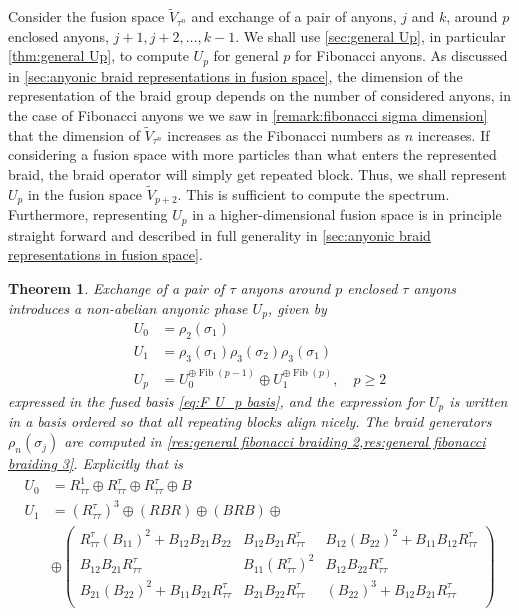 \documentclass[a4paper,10pt,oneside]{book}
\theoremstyle{plain}
\newtheorem{theorem}{Theorem}[section]
\theoremstyle{definition}
\theoremstyle{remark}
\DeclareMathOperator{\Fib}{Fib}
\begin{document}
Consider the fusion space $\widetilde{V}_{τ^n}$ and exchange of a pair of anyons, $j$ and $k$, around $p$ enclosed anyons, $j+1, j+2, \ldots, k-1$.
We shall use \cref{sec:general Up}, in particular \cref{thm:general Up}, to compute $U_p$ for general $p$ for Fibonacci anyons. As discussed in \cref{sec:anyonic braid representations in fusion space}, the dimension of the representation of the braid group depends on the number of considered anyons, in the case of Fibonacci anyons we we saw in \cref{remark:fibonacci sigma dimension} that the dimension of $\widetilde{V}_{τ^n}$ increases as the Fibonacci numbers as $n$ increases. If considering a fusion space with more particles than what enters the represented braid, the braid operator will simply get repeated block. Thus, we shall represent $U_p$ in the fusion space $\widetilde{V}_{p+2}$. This is sufficient to compute the spectrum. Furthermore, representing $U_p$ in a higher-dimensional fusion space is in principle straight forward and described in full generality in \cref{sec:anyonic braid representations in fusion space}.

\begin{theorem}\label{thm:fibonacci U_p}
  Exchange of a pair of $τ$ anyons around $p$ enclosed $τ$ anyons introduces a non-abelian anyonic phase $U_p$, given by
  \begin{equation}
    \begin{aligned}
      U_0 &= ρ_2(σ_1) \\
      U_1 &= ρ_3(σ_1) ρ_3(σ_2) ρ_3(σ_1) \\
      U_p &= U_0^{\oplus\Fib(p-1)} \oplus U_1^{\oplus\Fib(p)}, \quad p \ge 2
    \end{aligned}
  \end{equation}
  expressed in the fused basis \cref{eq:F U_p basis}, and the expression for $U_p$ is written in a basis ordered so that all repeating blocks align nicely. The braid generators $ρ_n(σ_j)$ are computed in \cref{res:general fibonacci braiding 2,res:general fibonacci braiding 3}.
  Explicitly that is
  \begin{equation}
    \begin{aligned}
      U_0 &= R_{ττ}^1 \oplus R_{ττ}^τ \oplus R_{ττ}^τ \oplus B \\
      U_1 &= \left( R_{ττ}^τ \right)^3 \oplus \left( RBR \right) \oplus \left( BRB \right)
      \oplus \\
      & \oplus
      \begin{pmatrix}
        R_{\tau\tau}^\tau \left(B_{11}\right)^2+B_{12} B_{21} B_{22} & B_{12} B_{21} R_{\tau\tau}^\tau & B_{12} \left(B_{22}\right)^2+B_{11} B_{12} R_{\tau\tau}^\tau \\
        B_{12} B_{21} R_{\tau\tau}^\tau & B_{11} \left(R_{\tau\tau}^\tau\right)^2 & B_{12} B_{22} R_{\tau\tau}^\tau \\
        B_{21} \left(B_{22}\right)^2+B_{11} B_{21} R_{\tau\tau}^\tau & B_{21} B_{22} R_{\tau\tau}^\tau & \left(B_{22}\right)^3+B_{12} B_{21} R_{\tau\tau}^\tau \\
      \end{pmatrix}
    \end{aligned}
  \end{equation}
\end{theorem}
\end{document}
